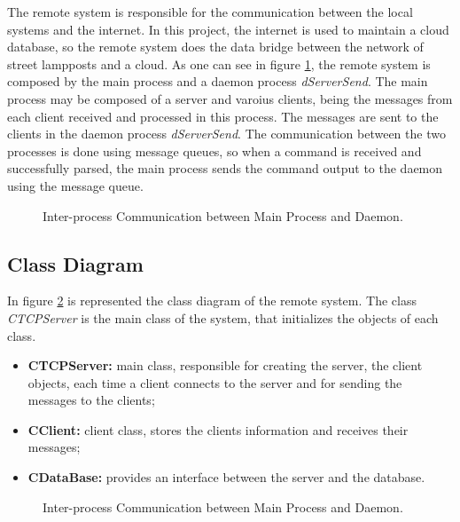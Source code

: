The remote system is responsible for the communication between the local systems and the internet. In this project, the internet is used to maintain a cloud database, so the remote system does the data bridge between the network of street lampposts and a cloud. As one can see in figure \ref{fig:rs_overview}, the remote system is composed by the main process and a daemon process \textit{dServerSend}. The main process may be composed of a server and varoius clients, being the messages from each client received and processed in this process. The messages are sent to the clients in the daemon process \textit{dServerSend}. The communication between the two processes is done using message queues, so when a command is received and successfully parsed, the main process sends the command output to the daemon using the message queue.

\begin{figure}[H]
	\centering
	\caption{Inter-process Communication between Main Process and Daemon.}
	\label{fig:rs_overview}
\end{figure}

\subsection{Class Diagram}
In figure \ref{fig:rs_classDiag} is represented the class diagram of the remote system. The class \textit{CTCPServer} is the main class of the system, that initializes the objects of each class. 

\begin{itemize}
	\item \textbf{CTCPServer:} main class, responsible for creating the server, the client objects, each time a client connects to the server and for sending the messages to the clients;
	\item \textbf{CClient:} client class, stores the clients information and receives their messages;
	\item \textbf{CDataBase:} provides an interface between the server and the database.

\end{itemize}

\begin{figure}[H]
	\centering
	\caption{Inter-process Communication between Main Process and Daemon.}
	\label{fig:rs_classDiag}
\end{figure}

